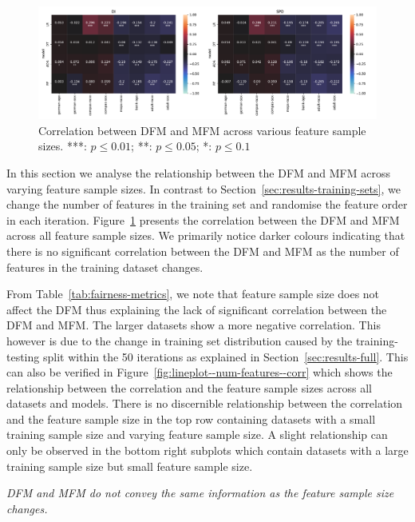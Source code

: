 \documentclass{article}
\newcommand{\highlight}[1]{\begin{framed}%
  \noindent\emph{#1}
\end{framed}}
\begin{document}
\begin{figure}
  \centering
  \includegraphics[width=0.95\linewidth]{heatmap--corr--num-features.pdf}
  \caption{Correlation between DFM and MFM across various feature
  sample sizes. ***: $p\le0.01$; **: $p\le0.05$; *: $p\le0.1$}
  \label{fig:heatmap--corr--num-features}
\end{figure}

In this section we analyse the relationship between the DFM and MFM
across varying feature sample sizes. In contrast to
Section \ref{sec:results-training-sets}, we change the number of
features in the training set and randomise the feature order in each
iteration. Figure \ref{fig:heatmap--corr--num-features} presents the
correlation between the DFM and MFM across all feature sample
sizes. We primarily notice darker colours indicating that there is no
significant correlation between the DFM and MFM as the number of
features in the training dataset changes.

From Table \ref{tab:fairness-metrics}, we note that feature sample
size does not affect the DFM thus explaining the lack of significant
correlation between the DFM and MFM. The larger datasets show a more
negative correlation. This however is due to the change in training
set distribution caused by the training-testing split within the 50
iterations as explained in Section \ref{sec:results-full}. This can
also be verified in Figure \ref{fig:lineplot--num-features--corr}
which shows the relationship between the correlation and the feature
sample sizes across all datasets and models. There is no discernible
relationship between the correlation and the feature sample size in
the top row containing datasets with a small training sample size and
varying feature sample size. A slight relationship can only be
observed in the bottom right subplots which contain datasets with
a large training sample size but small feature sample size.

\highlight{DFM and MFM do not convey the same information as the
feature sample size changes.}
\end{document}
